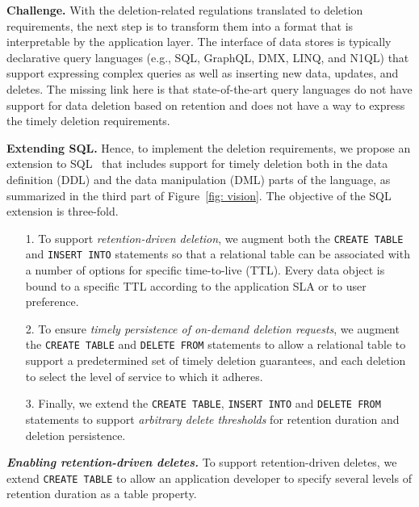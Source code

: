 \documentclass[11pt,dvipdfmx]{article}
\newcommand\Paragraph[1]{\vspace{0.02in}  \noindent \textbf{#1.}}
\newcommand\Paragraphbit[1]{\vspace{0.02in}  \noindent \textbf{\textit{#1.}}}
\begin{document}
\Paragraph{Challenge} With the deletion-related regulations translated to deletion requirements, the next step 
is to transform them into a format that is interpretable by the application layer. The interface of
data stores is typically declarative query languages (e.g., SQL, GraphQL, DMX, LINQ, and N1QL) that support expressing complex queries as well as
inserting new data, updates, and deletes. The missing link here
is that state-of-the-art query languages do not have support for data deletion based on retention and
does not have a way to express the timely deletion requirements. 


\Paragraph{Extending SQL}
Hence, to implement the deletion requirements, we propose an extension to SQL~\cite{Sarkar2022} that includes
support for timely deletion both in the data definition (DDL) and the data 
manipulation (DML) parts of the language, as summarized in the third part of 
Figure~\ref{fig: vision}. 
The objective of the SQL extension is three-fold. 

\begin{itemize} \vspace*{-0.5mm}
	\item[1.] To support \textit{retention-driven deletion}, we augment both the \texttt{CREATE TABLE} and \texttt{INSERT INTO} statements so that a relational table can be associated with a number of options for specific time-to-live (TTL). Every data object is bound to a specific TTL according to the application SLA or to user preference. 
	\item[2.] To ensure \textit{timely persistence of on-demand deletion requests}, we augment the \texttt{CREATE TABLE} and \texttt{DELETE FROM} statements to allow a relational table to support a predetermined set of timely deletion guarantees, and each deletion to select the level of service to which it adheres.
	\item[3.] Finally, we extend the \texttt{CREATE TABLE}, \texttt{INSERT INTO} and \texttt{DELETE FROM} statements to support \emph{arbitrary delete thresholds} for retention duration and deletion persistence.
\end{itemize}

 


\Paragraphbit{Enabling retention-driven deletes}
To support retention-driven deletes, we extend \texttt{CREATE TABLE} to allow an
application developer to specify several levels of retention duration as a table property.
\end{document}
